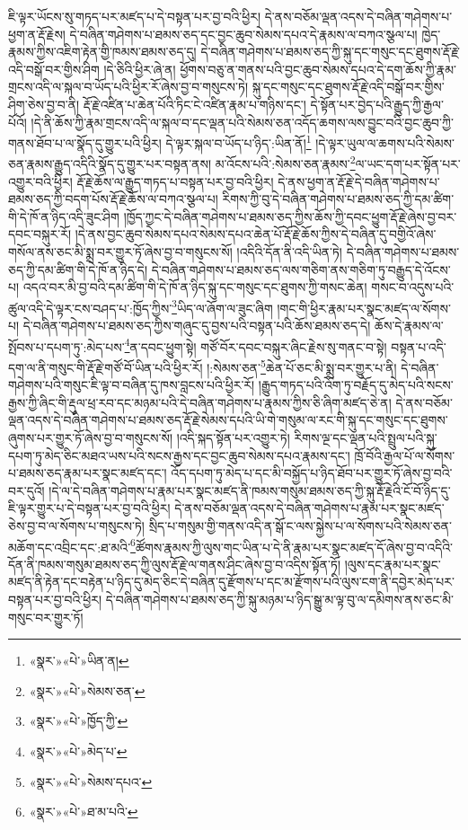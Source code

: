 ཇི་ལྟར་ཡོངས་སུ་གཏད་པར་མཛད་པ་དེ་བསྟན་པར་བྱ་བའི་ཕྱིར། དེ་ནས་བཅོམ་ལྡན་འདས་དེ་བཞིན་གཤེགས་པ་ཕྱག་ན་རྡོ་རྗེས། དེ་བཞིན་གཤེགས་པ་ཐམས་ཅད་དང་བྱང་ཆུབ་སེམས་དཔའ་དེ་རྣམས་ལ་བཀའ་སྩལ་པ། ཁྱེད་རྣམས་ཀྱིས་འཇིག་རྟེན་གྱི་ཁམས་ཐམས་ཅད་དུ། དེ་བཞིན་གཤེགས་པ་ཐམས་ཅད་ཀྱི་སྐུ་དང་གསུང་དང་ཐུགས་རྡོ་རྗེ་འདི་བསྒོ་བར་གྱིས་ཤིག །དེ་ཅིའི་ཕྱིར་ཞེ་ན། ཕྱོགས་བཅུ་ན་གནས་པའི་བྱང་ཆུབ་སེམས་དཔའ་དེ་དག་ཆོས་ཀྱི་རྣམ་གྲངས་འདི་ལ་སྐལ་བ་ཡོད་པའི་ཕྱིར་རོ་ཞེས་བྱ་བ་གསུངས་ཏེ། སྐུ་དང་གསུང་དང་ཐུགས་རྡོ་རྗེ་འདི་བསྒོ་བར་གྱིས་ཤིག་ཅེས་བྱ་བ་ནི། རྡོ་རྗེ་འཛིན་པ་ཆེན་པོའི་ཏིང་ངེ་འཛིན་རྣམ་པ་གཉིས་དང་། དེ་སྟོན་པར་བྱེད་པའི་རྒྱུད་ཀྱི་རྒྱལ་པོའོ། །དེ་ནི་ཆོས་ཀྱི་རྣམ་གྲངས་འདི་ལ་སྐལ་བ་དང་ལྡན་པའི་སེམས་ཅན་འདོད་ཆགས་ལས་བྱུང་བའི་བྱང་ཆུབ་ཀྱི་གནས་ཐོབ་པ་ལ་སྣོད་དུ་གྱུར་པའི་ཕྱིར། དེ་ལྟར་སྐལ་བ་ཡོད་པ་ཉིད་:ཡིན་ནོ།\footnote{«སྣར་»«པེ་»ཡིན་ན།} །དེ་ལྟར་ཡུལ་ལ་ཆགས་པའི་སེམས་ཅན་རྣམས་རྒྱུད་འདིའི་སྣོད་དུ་གྱུར་པར་བསྟན་ནས། མ་འོངས་པའི་:སེམས་ཅན་རྣམས་\footnote{«སྣར་»«པེ་»སེམས་ཅན་}ལ་ཡང་དག་པར་སྟོན་པར་འགྱུར་བའི་ཕྱིར། རྡོ་རྗེ་ཆོས་ལ་རྒྱུད་གཏད་པ་བསྟན་པར་བྱ་བའི་ཕྱིར། དེ་ནས་ཕྱག་ན་རྡོ་རྗེ་དེ་བཞིན་གཤེགས་པ་ཐམས་ཅད་ཀྱི་བདག་པོས་རྡོ་རྗེ་ཆོས་ལ་བཀའ་སྩལ་པ། རིགས་ཀྱི་བུ་དེ་བཞིན་གཤེགས་པ་ཐམས་ཅད་ཀྱི་དམ་ཚིག་གི་དེ་ཁོ་ན་ཉིད་འདི་ཟུང་ཤིག །ཁྱོད་ཀྱང་དེ་བཞིན་གཤེགས་པ་ཐམས་ཅད་ཀྱིས་ཆོས་ཀྱི་དབང་ཕྱུག་རྡོ་རྗེ་ཞེས་བྱ་བར་དབང་བསྐུར་རོ། །དེ་ནས་བྱང་ཆུབ་སེམས་དཔའ་སེམས་དཔའ་ཆེན་པོ་རྡོ་རྗེ་ཆོས་ཀྱིས་དེ་བཞིན་དུ་བགྱིའོ་ཞེས་གསོལ་ནས་ཅང་མི་སྨྲ་བར་གྱུར་ཏོ་ཞེས་བྱ་བ་གསུངས་སོ། །འདིའི་དོན་ནི་འདི་ཡིན་ཏེ། དེ་བཞིན་གཤེགས་པ་ཐམས་ཅད་ཀྱི་དམ་ཚིག་གི་དེ་ཁོ་ན་ཉིད་དེ། དེ་བཞིན་གཤེགས་པ་ཐམས་ཅད་ལས་གཅིག་ནས་གཅིག་ཏུ་བརྒྱུད་དེ་འོངས་པ། འདའ་བར་མི་བྱ་བའི་དམ་ཚིག་གི་དེ་ཁོ་ན་ཉིད་སྐུ་དང་གསུང་དང་ཐུགས་ཀྱི་གསང་ཆེན། གསང་བ་འདུས་པའི་ཚུལ་འདི་དེ་ལྟར་ངས་བཤད་པ་:ཁྱོད་ཀྱིས་\footnote{«སྣར་»«པེ་»ཁྱོད་ཀྱི་}ཡིད་ལ་ཞོག་ལ་ཟུང་ཞིག །གང་གི་ཕྱིར་རྣམ་པར་སྣང་མཛད་ལ་སོགས་པ། དེ་བཞིན་གཤེགས་པ་ཐམས་ཅད་ཀྱིས་གཞུང་དུ་བྱས་པའི་བསྟན་པའི་ཆོས་ཐམས་ཅད་དེ། ཆོས་དེ་རྣམས་ལ་སྤོབས་པ་དཔག་ཏུ་:མེད་པས་\footnote{«སྣར་»«པེ་»མེད་པ་}ན་དབང་ཕྱུག་སྟེ། གཙོ་བོར་དབང་བསྐུར་ཞིང་རྗེས་སུ་གནང་བ་སྟེ། བསྟན་པ་འདི་དག་ལ་ནི་གསུང་གི་རྡོ་རྗེ་གཙོ་བོ་ཡིན་པའི་ཕྱིར་རོ། །:སེམས་ཅན་\footnote{«སྣར་»«པེ་»སེམས་དཔའ་}ཆེན་པོ་ཅང་མི་སྨྲ་བར་གྱུར་པ་ནི། དེ་བཞིན་གཤེགས་པའི་གསུང་ཇི་ལྟ་བ་བཞིན་དུ་ཁས་བླངས་པའི་ཕྱིར་རོ། །རྒྱུད་གཏད་པའི་འོག་ཏུ་བརྗོད་དུ་མེད་པའི་སངས་རྒྱས་ཀྱི་ཞིང་གི་རྡུལ་ཕྲ་རབ་དང་མཉམ་པའི་དེ་བཞིན་གཤེགས་པ་རྣམས་ཀྱིས་ཅི་ཞིག་མཛད་ཅེ་ན། དེ་ནས་བཅོམ་ལྡན་འདས་དེ་བཞིན་གཤེགས་པ་ཐམས་ཅད་རྡོ་རྗེ་སེམས་དཔའི་ཡི་གེ་གསུམ་ལ་རང་གི་སྐུ་དང་གསུང་དང་ཐུགས་ཞུགས་པར་གྱུར་ཏོ་ཞེས་བྱ་བ་གསུངས་སོ། །འདི་སྐད་སྟོན་པར་འགྱུར་ཏེ། རིགས་ལྔ་དང་ལྡན་པའི་སྤྲུལ་པའི་སྐུ་དཔག་ཏུ་མེད་ཅིང་མཐའ་ཡས་པའི་སངས་རྒྱས་དང་བྱང་ཆུབ་སེམས་དཔའ་རྣམས་དང་། ཁྲོ་བོའི་རྒྱལ་པོ་ལ་སོགས་པ་ཐམས་ཅད་རྣམ་པར་སྣང་མཛད་དང་། འོད་དཔག་ཏུ་མེད་པ་དང་མི་བསྐྱོད་པ་ཉིད་ཐོབ་པར་གྱུར་ཏོ་ཞེས་བྱ་བའི་བར་དུའོ། །དེ་ལ་དེ་བཞིན་གཤེགས་པ་རྣམ་པར་སྣང་མཛད་ནི་ཁམས་གསུམ་ཐམས་ཅད་ཀྱི་སྐུ་རྡོ་རྗེའི་ངོ་བོ་ཉིད་དུ་ཇི་ལྟར་གྱུར་པ་དེ་བསྟན་པར་བྱ་བའི་ཕྱིར། དེ་ནས་བཅོམ་ལྡན་འདས་དེ་བཞིན་གཤེགས་པ་རྣམ་པར་སྣང་མཛད་ཅེས་བྱ་བ་ལ་སོགས་པ་གསུངས་ཏེ། སྲིད་པ་གསུམ་གྱི་གནས་འདི་ན་སྒོ་ང་ལས་སྐྱེས་པ་ལ་སོགས་པའི་སེམས་ཅན་མཆོག་དང་འབྲིང་དང་:ཐ་མའི་\footnote{«སྣར་»«པེ་»ཐ་མ་པའི་}ཚོགས་རྣམས་ཀྱི་ལུས་གང་ཡིན་པ་དེ་ནི་རྣམ་པར་སྣང་མཛད་དོ་ཞེས་བྱ་བ་འདིའི་དོན་ནི་ཁམས་གསུམ་ཐམས་ཅད་ཀྱི་ལུས་རྡོ་རྗེ་ལ་གནས་ཤིང་ཞེས་བྱ་བ་འདིས་སྟོན་ཏོ། །ལུས་དང་རྣམ་པར་སྣང་མཛད་ནི་རྟེན་དང་བརྟེན་པ་ཉིད་དུ་མེད་ཅིང་དེ་བཞིན་དུ་རྫོགས་པ་དང་མ་རྫོགས་པའི་ལུས་ངག་ནི་དབྱེར་མེད་པར་བསྟན་པར་བྱ་བའི་ཕྱིར། དེ་བཞིན་གཤེགས་པ་ཐམས་ཅད་ཀྱི་སྐུ་མཉམ་པ་ཉིད་སྒྱུ་མ་ལྟ་བུ་ལ་དམིགས་ནས་ཅང་མི་གསུང་བར་གྱུར་ཏོ། 